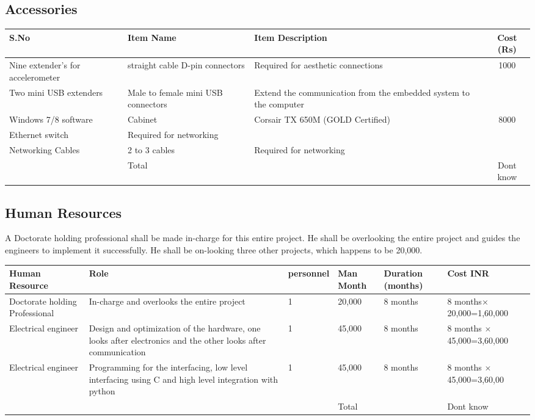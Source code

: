 \documentclass{FR16}
\begin{document}
\subsection{Accessories}
\begin{center}
\begin{tabular}{||p{3 cm} ||p{4 cm}|| p{6 cm}|| c|| }
\arrayrulecolor{Azzurro}
\hline
\hline
{\bfseries S.No} & {\bfseries Item Name}& {\bfseries Item Description} & {\bfseries Cost (Rs)} \\
\hline
\hline
Nine extender's for accelerometer &straight cable D-pin connectors & Required for aesthetic connections & 1000\\
\hline
\hline
Two mini USB extenders & Male to female mini USB connectors& Extend the communication from the embedded system to the computer & &\\
\hline
\hline
Windows 7/8 software &Cabinet &  Corsair TX 650M (GOLD Certified) & 8000\\
\hline
\hline
Ethernet switch & Required for networking & &\\
\hline
\hline
Networking Cables & 2 to 3 cables & Required for networking&\\
\hline
\hline
& Total & & Dont know
 
 \end{tabular}
\end{center}



\newpage
\subsection{Human Resources}
A Doctorate holding professional shall be made in-charge for this entire project. He shall be overlooking the entire project and guides the engineers to implement it successfully. He shall be on-looking three other projects, which happens to be 20,000. 
\begin{center}
\begin{tabular}{||p{2 cm} ||p{3 cm}||p{1.5 cm}|| p{1.5 cm}|| p{2 cm}||p{3 cm}|| }
\arrayrulecolor{Azzurro}
\hline
\hline

{\bfseries Human Resource } & {\bfseries Role} & {\bfseries personnel}&{\bfseries Man Month}& {\bfseries Duration (months)} & {\bfseries Cost INR} \\
\hline
\hline
 Doctorate holding Professional  & In-charge and overlooks the entire project &1 & 20,000 & 8 months & 8 months$\times$ 20,000=1,60,000\\
\hline
\hline
Electrical engineer & Design and optimization of the hardware, one looks after electronics and the other looks after communication  &1 & 45,000 & 8 months & 8 months $\times$ 45,000=3,60,000\\
\hline
\hline
Electrical engineer &Programming for the interfacing, low level interfacing using C and high level integration with python  &1 & 45,000 & 8 months & 8 months $\times$ 45,000=3,60,00\\
\hline
\hline
& & & Total & & Dont know
\end{tabular}
\end{center}
\end{document}
